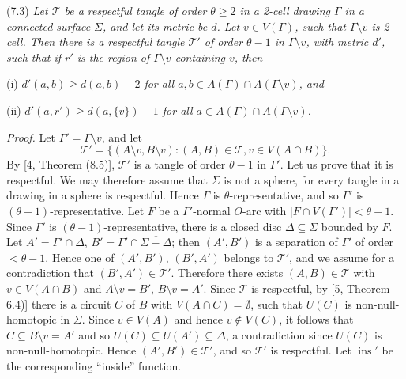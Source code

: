 \stmt
(7.3) \textit{Let $\mathscr{T}$ be a respectful tangle of order $\theta \ge 2$ in a 2-cell drawing $\Gamma$ in a connected surface $\Sigma$, and let its metric be $d$. Let $v \in V(\Gamma)$, such that $\Gamma \setminus v$ is 2-cell. Then there is a respectful tangle $\mathscr{T}'$ of order $\theta - 1$ in $\Gamma \setminus v$, with metric $d'$, such that if $r'$ is the region of $\Gamma \setminus v$ containing $v$, then}

\hspace*{12pt}(i) \textit{$d'(a, b) \ge d(a, b) - 2$ for all $a, b \in A(\Gamma) \cap A(\Gamma \setminus v)$, and}

\hspace*{12pt}(ii) \textit{$d'(a, r') \ge d(a, \{v\}) - 1$ for all $a \in A(\Gamma) \cap A(\Gamma \setminus v)$.}

\textit{Proof.} Let $\Gamma' = \Gamma \setminus v$, and let
\begin{equation*}
\mathscr{T}' = \{(A \setminus v, B \setminus v) : (A, B) \in \mathscr{T}, v \in V(A \cap B)\}.
\end{equation*}
By [4, Theorem (8.5)], $\mathscr{T}'$ is a tangle of order $\theta - 1$ in $\Gamma'$. Let us prove that it is respectful. We may therefore assume that $\Sigma$ is not a sphere, for every tangle in a drawing in a sphere is respectful. Hence $\Gamma$ is $\theta$-representative, and so $\Gamma'$ is $(\theta - 1)$-representative. Let $F$ be a $\Gamma'$-normal $O$-arc with $|F \cap V(\Gamma')| < \theta - 1$. Since $\Gamma'$ is $(\theta - 1)$-representative, there is a closed disc $\Delta \subseteq \Sigma$ bounded by $F$. Let $A' = \Gamma' \cap \Delta$, $B' = \Gamma' \cap \overline{\Sigma - \Delta}$; then $(A', B')$ is a separation of $\Gamma'$ of order $< \theta - 1$. Hence one of $(A', B')$, $(B', A')$ belongs to $\mathscr{T}'$, and we assume for a contradiction that $(B', A') \in \mathscr{T}'$. Therefore there exists $(A, B) \in \mathscr{T}$ with $v \in V(A \cap B)$ and $A \setminus v = B'$, $B \setminus v = A'$. Since $\mathscr{T}$ is respectful, by [5, Theorem 6.4)] there is a circuit $C$ of $B$ with $V(A \cap C) = \emptyset$, such that $U(C)$ is non-null-homotopic in $\Sigma$. Since $v \in V(A)$ and hence $v \notin V(C)$, it follows that $C \subseteq B \setminus v = A'$ and so $U(C) \subseteq U(A') \subseteq \Delta$, a contradiction since $U(C)$ is non-null-homotopic. Hence $(A', B') \in \mathscr{T}'$, and so $\mathscr{T}'$ is respectful. Let $\operatorname{ins}'$ be the corresponding ``inside'' function.

